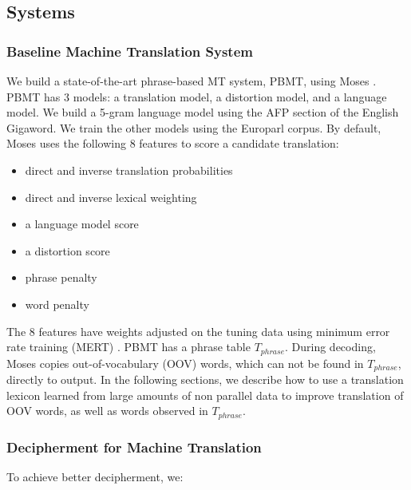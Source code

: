 \subsection{Systems}
\subsubsection{Baseline Machine Translation System}
We build a state-of-the-art phrase-based MT system, PBMT, using Moses \cite{Moses}.
PBMT has 3 models: a translation model, a distortion model, and a language model. We build a 5-gram language model using the AFP section of the English Gigaword. We train the other models using the Europarl corpus. By default, Moses uses the following 8 features to score a candidate translation:

\begin{itemize}
\item direct and inverse translation probabilities
\item direct and inverse lexical weighting
\item a language model score
\item a distortion score
\item phrase penalty
\item word penalty
\end{itemize}

The 8 features have weights adjusted on the tuning data using minimum error rate training (MERT) \cite{Och:2003:MER:1075096.1075117}. PBMT has a phrase table $T_{phrase}$. During decoding, Moses copies out-of-vocabulary (OOV) words, which can not be found in $T_{phrase}$, directly to output. In the following sections, we describe how to use a translation lexicon learned from large amounts of non parallel data to improve translation of OOV words, as well as words observed in $T_{phrase}$.

\subsubsection{Decipherment for Machine Translation}
To achieve better decipherment, we:


